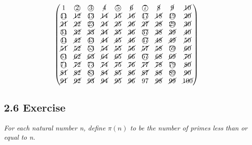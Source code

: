 \documentclass{article}
\begin{document}
\begin{equation*}
    \begin{pmatrix}
        1 & \text{\textcircled{2}} & \text{\textcircled{3}} & \cancel{4} & \text{\textcircled{5}} & \cancel{6} & \text{\textcircled{7}} & \cancel{8} & \cancel{9} & \cancel{10}\\
        \text{\textcircled{11}} & \cancel{12} & \text{\textcircled{13}} & \cancel{14} & \cancel{15} & \cancel{16} & \text{\textcircled{17}} & \cancel{18} & \text{\textcircled{19}} & \cancel{20}\\
        \cancel{21} & \cancel{22} & \text{\textcircled{23}} & \cancel{24} & \cancel{25} & \cancel{26} & \cancel{27} & \cancel{28} & \text{\textcircled{29}} & \cancel{30}\\
        \text{\textcircled{31}} & \cancel{32} & \cancel{33} & \cancel{34} & \cancel{35} & \cancel{36} & \text{\textcircled{37}} & \cancel{38} & \cancel{39} & \cancel{40}\\
        \text{\textcircled{41}} & \cancel{42} & \text{\textcircled{43}} & \cancel{44} & \cancel{45} & \cancel{46} & \text{\textcircled{47}} & \cancel{48} & \cancel{49} & \cancel{50}\\
        \cancel{51} & \cancel{52} & \text{\textcircled{53}} & \cancel{54} & \cancel{55} & \cancel{56} & \cancel{57} & \cancel{58} & \text{\textcircled{59}} & \cancel{60}\\
        \text{\textcircled{61}} & \cancel{62} & \cancel{63} & \cancel{64} & \cancel{65} & \cancel{66} & \text{\textcircled{67}} & \cancel{68} & \cancel{69} & \cancel{70}\\
        \text{\textcircled{71}} & \cancel{72} & \text{\textcircled{73}} & \cancel{74} & \cancel{75} & \cancel{76} & \cancel{77} & \cancel{78} & \text{\textcircled{79}} & \cancel{80}\\
        \cancel{81} & \cancel{82} & \text{\textcircled{83}} & \cancel{84} & \cancel{85} & \cancel{86} & \cancel{87} & \cancel{88} & \text{\textcircled{89}} & \cancel{90}\\
        \cancel{91} & \cancel{92} & \cancel{93} & \cancel{94} & \cancel{95} & \cancel{96} & 97 & \cancel{98} & \cancel{99} & \cancel{100}
    \end{pmatrix}
\end{equation*}

\subsection*{2.6 Exercise} 
\quad \textit{For each natural number n, define $\pi(n)$ to be the number of primes less than or equal to n.}
\end{document}
